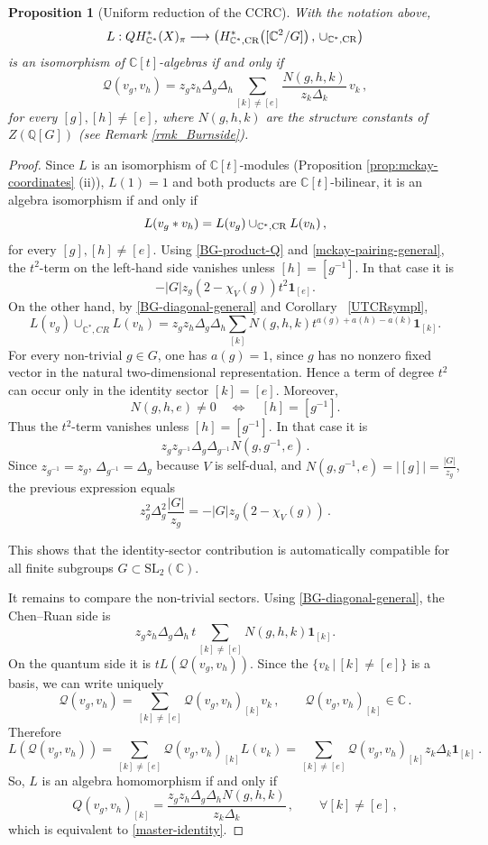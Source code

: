 \documentclass[a4paper,reqno]{amsart}
\theoremstyle{plain} %
\newtheorem{prop}[thm]{Proposition}
\theoremstyle{definition} %
\theoremstyle{remark} %
\newcommand{\Q}{\mathbb{Q}}
\newcommand{\C}{\mathbb{C}}
\newcommand{\fo}{\mathbf{1}}
\newcommand{\1}{\mathds{1}}   %
\begin{document}
\begin{prop}[Uniform reduction of the CCRC]\label{prop:uniform-reduction}
With the notation above, 
\[
L:
QH^*_{\mathbb C^*}(X)_{\pi}
\longrightarrow
\left( H^*_{\mathbb C^*,\mathrm{CR}}
\bigl([\mathbb C^2/G]\bigr) \, , \, \cup_{\C^*, {\rm CR}} \right) \, 
\]
is an isomorphism of $\mathbb C[t]$-algebras if and only if
\begin{equation}\label{master-identity}
\mathcal Q(v_g,v_h)
=
z_gz_h\Delta_g\Delta_h
\sum_{[k]\neq[e]}
\frac{N(g,h,k)}{z_k\Delta_k}\,v_k \, , 
\end{equation}
for every $[g], [h] \not= [e]$, where $N(g, h, k)$ are the structure constants of $Z(\Q [G])$ (see Remark \ref{rmk_Burnside}).
\end{prop}
\begin{proof}
Since $L$ is an isomorphism of $\C[t]$-modules (Proposition \ref{prop:mckay-coordinates} (ii)),
 \(L(1)=1\) and both products are \(\mathbb C[t]\)-bilinear,
 it is an algebra isomorphism 
if and only if 
\[
L(v_g * v_h) = L(v_g) \cup_{\C^*, {\rm CR}} L(v_h) \, ,
\] 
for every $[g], [h] \not= [e]$. 
Using \eqref{BG-product-Q} and \eqref{mckay-pairing-general}, the $t^2$-term on the left-hand side
vanishes unless $[h]=[g^{-1}]$. In that case it is
\[
-|G|z_g(2-\chi_V(g))t^2 \fo_{[e]}.
\]
On the other hand, by \eqref{BG-diagonal-general} and Corollary ~\ref{UTCRsympl},
\[
L(v_g)\cup_{\mathbb C^*,CR}L(v_h)
=
z_gz_h\Delta_g\Delta_h
\sum_{[k]}
N(g,h,k)t^{a(g)+a(h)-a(k)}\fo_{[k]}.
\]
For every non-trivial $g\in G$, one has $a(g)=1$, since $g$
has no nonzero fixed vector in the natural two-dimensional
representation. Hence a term of degree $t^2$ can occur only in the
identity sector $[k]=[e]$. Moreover,
\[
N(g,h,e)\neq0
\quad\Longleftrightarrow\quad
[h]=[g^{-1}].
\]
Thus the $t^2$-term vanishes unless $[h]=[g^{-1}]$. In that case it is
\[ 
z_gz_{g^{-1}} \Delta_g \Delta_{g^{-1}} N(g, g^{-1}, e ) \, .
\] 
Since $z_{g^{-1}} =z_g$,  $\Delta_{g^{-1}} =\Delta_{g}$ because $V$ is self-dual, and $N(g, g^{-1}, e )= |[g]| = \frac{|G|}{z_g}$,
the previous expression equals
\[
z_g^2 \Delta_g^2 \frac{|G|}{z_g} = -|G|z_g(2-\chi_V(g)) \, .
\]

This shows that the identity-sector contribution is automatically compatible for all finite
subgroups $G\subset\mathrm{SL}_2(\mathbb C)$.



It remains to compare the non-trivial sectors. Using
\eqref{BG-diagonal-general}, the Chen--Ruan side is
\[
z_gz_h\Delta_g\Delta_h\,t
\sum_{[k]\neq[e]}N(g,h,k)\fo_{[k]}.
\]
On the quantum side it is $tL(\mathcal Q(v_g,v_h))$. Since the $\{ v_k \, | \, [k] \not= [e] \}$ is a
basis, we can write uniquely
\[
\mathcal Q(v_g,v_h) = \sum_{[k] \not= [e]} {\mathcal Q(v_g,v_h)}_{[k]} v_k \, , \qquad {\mathcal Q(v_g,v_h)}_{[k]} \in \C \, .
\]
Therefore
\[
L(\mathcal Q(v_g,v_h)) = \sum_{[k] \not= [e]} {\mathcal Q(v_g,v_h)}_{[k]} L(v_k) = 
\sum_{[k] \not= [e]} {\mathcal Q(v_g,v_h)}_{[k]} z_k\Delta_k\fo_{[k]} \, .
\]
So, $L$ is an algebra homomorphism if and only if
\[
{Q(v_g,v_h)}_{[k]} = \frac{z_gz_h\Delta_g \Delta_h N(g,h,k)}{z_k\Delta_k} \, , \qquad \forall [k] \not= [e] \, ,
\]
which  is equivalent to \eqref{master-identity}.
\end{proof}
\end{document}
